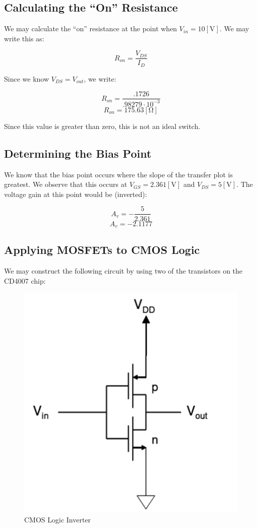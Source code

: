 \documentclass[
	letterpaper, %
	10pt, %
]{CSUniSchoolLabReport}
\begin{document}
\subsection{Calculating the ``On'' Resistance}

We may calculate the ``on'' resistance at the point when $V_{in}=10[\si{\volt}]$. We may write this as:

$$R_{on}=\frac{V_{DS}}{I_D}$$

Since we know $V_{DS}=V_{out}$, we write:

$$R_{on}=\frac{.1726}{.98279\cdot10^{-3}}$$
$$\boxed{R_{on}=175.63[\si{\ohm}]}$$

Since this value is greater than zero, this is not an ideal switch.

\subsection{Determining the Bias Point}

We know that the bias point occurs where the slope of the transfer plot is greatest. We observe that this occurs at $V_{GS}=2.361[\si{\volt}]$ and $V_{DS}=5[\si{\volt}]$. The voltage gain at this point would be (inverted):

$$A_v=-\frac{5}{2.361}$$
$$\boxed{A_v=-2.1177}$$

\subsection{Applying MOSFETs to CMOS Logic}

We may construct the following circuit by using two of the transistors on the CD4007 chip:

\begin{figure}[H]
  \centering
  \includegraphics[width=.6\textwidth]{Figures/L5F4}
  \caption{CMOS Logic Inverter}
  \label{fig:4}
\end{figure}
\end{document}

